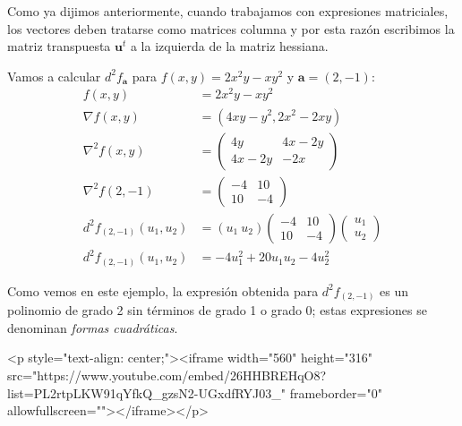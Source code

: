 Como ya dijimos anteriormente, cuando trabajamos con expresiones matriciales, los vectores deben tratarse como matrices columna y por esta razón escribimos la matriz transpuesta $\boldsymbol{u}^t$ a la izquierda de la matriz hessiana.
%
\begin{ejemplo}
Vamos a calcular $d^2f_{\boldsymbol a}$ para $f(x,y)=2x^2y-xy^2$ y $\boldsymbol a=(2,-1)$:
\begin{align*}
f(x,y) &= 2x^2y-xy^2 \\
\nabla f(x,y) &= (4xy-y^2,2x^2-2xy) \\
\nabla^2 f(x,y) &=
\begin{pmatrix}
4y & 4x-2y \\
4x-2y & -2x
\end{pmatrix}\\
\nabla^2 f(2,-1) &=
\begin{pmatrix}
-4 & 10 \\
10 & -4
\end{pmatrix}\\
d^2f_{(2,-1)}(u_1,u_2)&=(u_1\ u_2)
\begin{pmatrix}
-4 & 10 \\
10 & -4
\end{pmatrix}\begin{pmatrix}
u_1 \\
u_2
\end{pmatrix}\\
d^2f_{(2,-1)}(u_1,u_2)&=-4u_1^2+20u_1u_2-4u_2^2\tag*{\fej}
\end{align*}
\end{ejemplo}
Como vemos en este ejemplo, la expresión obtenida para $d^2f_{(2,-1)}$ es un polinomio de grado 2 sin términos de grado 1 o grado 0; estas expresiones se denominan \emph{formas cuadráticas}.

\begin{rawhtml}
<p style="text-align: center;"><iframe width="560" height="316" src="https://www.youtube.com/embed/26HHBREHqO8?list=PL2rtpLKW91qYfkQ_gzsN2-UGxdfRYJ03_" frameborder="0" allowfullscreen=""></iframe></p>
\end{rawhtml}

